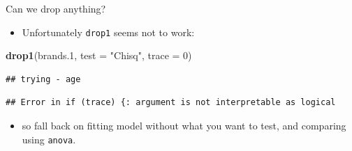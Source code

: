 \documentclass[
  ignorenonframetext,
]{beamer}
\newenvironment{Shaded}{\begin{snugshade}}{\end{snugshade}}
\newcommand{\DataTypeTok}[1]{\textcolor[rgb]{0.13,0.29,0.53}{#1}}
\newcommand{\DecValTok}[1]{\textcolor[rgb]{0.00,0.00,0.81}{#1}}
\newcommand{\FloatTok}[1]{\textcolor[rgb]{0.00,0.00,0.81}{#1}}
\newcommand{\KeywordTok}[1]{\textcolor[rgb]{0.13,0.29,0.53}{\textbf{#1}}}
\newcommand{\NormalTok}[1]{#1}
\newcommand{\StringTok}[1]{\textcolor[rgb]{0.31,0.60,0.02}{#1}}
\providecommand{\tightlist}{%
  \setlength{\itemsep}{0pt}\setlength{\parskip}{0pt}}
\begin{document}
\begin{frame}[fragile]{Can we drop anything?}
\protect\hypertarget{can-we-drop-anything}{}

\begin{itemize}
\tightlist
\item
  Unfortunately \texttt{drop1} seems not to work:
\end{itemize}

\begin{Shaded}
\begin{Highlighting}[]
\KeywordTok{drop1}\NormalTok{(brands}\FloatTok{.1}\NormalTok{, }\DataTypeTok{test =} \StringTok{"Chisq"}\NormalTok{, }\DataTypeTok{trace =} \DecValTok{0}\NormalTok{)}
\end{Highlighting}
\end{Shaded}

\begin{verbatim}
## trying - age
\end{verbatim}

\begin{verbatim}
## Error in if (trace) {: argument is not interpretable as logical
\end{verbatim}

\begin{itemize}
\tightlist
\item
  so fall back on fitting model without what you want to test, and
  comparing using \texttt{anova}.
\end{itemize}

\end{frame}
\end{document}
